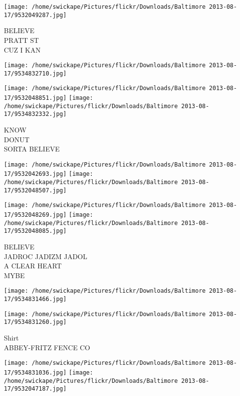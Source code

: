 \documentclass[10pt,letterpaper]{article}
\begin{document}
\texttt{[image: /home/swickape/Pictures/flickr/Downloads/Baltimore 2013-08-17/9532049287.jpg]}

BELIEVE\\
PRATT ST\\
CUZ I KAN\\
\pagebreak

\texttt{[image: /home/swickape/Pictures/flickr/Downloads/Baltimore 2013-08-17/9534832710.jpg]}

\vspace{0.25in}
\texttt{[image: /home/swickape/Pictures/flickr/Downloads/Baltimore 2013-08-17/9532048851.jpg]}
\texttt{[image: /home/swickape/Pictures/flickr/Downloads/Baltimore 2013-08-17/9534832332.jpg]}

KNOW\\
DONUT\\
SORTA BELIEVE\\
\pagebreak

\texttt{[image: /home/swickape/Pictures/flickr/Downloads/Baltimore 2013-08-17/9532042693.jpg]}
\texttt{[image: /home/swickape/Pictures/flickr/Downloads/Baltimore 2013-08-17/9532048507.jpg]}

\texttt{[image: /home/swickape/Pictures/flickr/Downloads/Baltimore 2013-08-17/9532048269.jpg]}
\texttt{[image: /home/swickape/Pictures/flickr/Downloads/Baltimore 2013-08-17/9532048085.jpg]}

BELIEVE\\
JADROC JADIZM JADOL\\
A CLEAR HEART\\
MYBE\\
\pagebreak

\texttt{[image: /home/swickape/Pictures/flickr/Downloads/Baltimore 2013-08-17/9534831466.jpg]}

\vspace{0.25in}
\texttt{[image: /home/swickape/Pictures/flickr/Downloads/Baltimore 2013-08-17/9534831260.jpg]}

Shirt\\
ABBEY{-}FRITZ FENCE CO\\
\pagebreak

\texttt{[image: /home/swickape/Pictures/flickr/Downloads/Baltimore 2013-08-17/9534831036.jpg]}
\texttt{[image: /home/swickape/Pictures/flickr/Downloads/Baltimore 2013-08-17/9532047187.jpg]}
\end{document}

